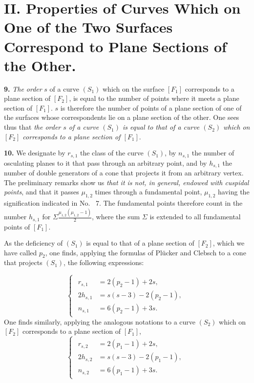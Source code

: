 \documentclass{article}
\begin{document}
\section*{II. Properties of Curves Which on One of the Two Surfaces Correspond to Plane Sections of the Other.}

\textbf{9.} \emph{The order} $s$ of a curve $(S_1)$ which on the surface $[F_1]$ corresponds to a plane section of $[F_2]$, is equal to the number of points where it meets a plane section of $[F_1]$. $s$ is therefore the number of points of a plane section of one of the surfaces whose correspondents lie on a plane section of the other. One sees thus that \emph{the order $s$ of a curve $(S_1)$ is equal to that of a curve $(S_2)$ which on $[F_2]$ corresponds to a plane section of $[F_1]$}.

\textbf{10.} We designate by $r_{s, 1}$ the class of the curve $(S_1)$, by $n_{s, 1}$ the number of osculating planes to it that pass through an arbitrary point, and by $h_{s, 1}$ the number of double generators of a cone that projects it from an arbitrary vertex. The preliminary remarks show us \emph{that it is not, in general, endowed with cuspidal points}, and that it passes $\mu_{1, 2}$ times through a fundamental point, $\mu_{1, 2}$ having the signification indicated in No.~ 7. The fundamental points therefore count in the number $h_{s, 1}$ for $\Sigma \frac{\mu_{1, 2}(\mu_{1, 2} - 1)}{2}$, where the sum $\Sigma$ is extended to all fundamental points of $[F_1]$.

As the deficiency of $(S_1)$ is equal to that of a plane section of $[F_2]$, which we have called $p_2$, one finds, applying the formulas of Plücker and Clebsch to a cone that projects $(S_1)$, the following expressions:

\[
\begin{cases}
\begin{aligned}
r_{s, 1} &= 2(p_2 - 1) + 2s, \\
2h_{s, 1} &= s(s - 3) - 2(p_2 - 1), \\
n_{s, 1} &= 6(p_2 - 1) + 3s.
\end{aligned}
\end{cases} \tag{$3_a$}
\]
One finds similarly, applying the analogous notations to a curve $(S_2)$ which on $[F_2]$ corresponds to a plane section of $[F_1]$,
\[
\begin{cases}
\begin{aligned}
r_{s, 2} &= 2(p_1 - 1) + 2s, \\
2h_{s, 2} &= s(s - 3) - 2(p_1 - 1), \\
n_{s, 2} &= 6(p_1 - 1) + 3s.
\end{aligned}
\end{cases} \tag{$3_b$}
\]
\end{document}
